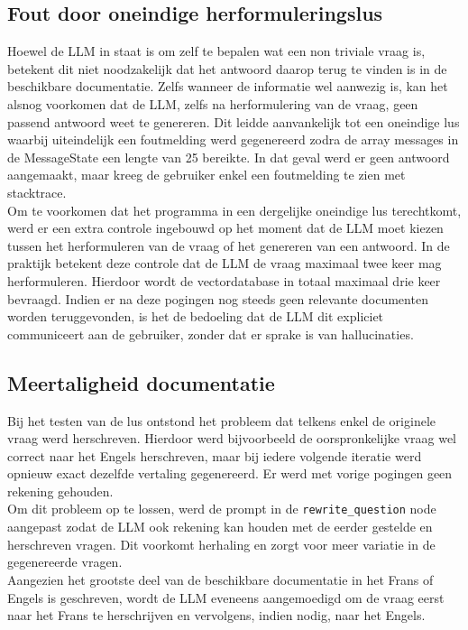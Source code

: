 \subsection{Fout door oneindige herformuleringslus}

Hoewel de LLM in staat is om zelf te bepalen wat een non triviale vraag is, betekent dit niet noodzakelijk dat het antwoord daarop terug te vinden is in de beschikbare documentatie. Zelfs wanneer de informatie wel aanwezig is, kan het alsnog voorkomen dat de LLM, zelfs na herformulering van de vraag, geen passend antwoord weet te genereren. Dit leidde aanvankelijk tot een oneindige lus waarbij uiteindelijk een foutmelding werd gegenereerd zodra de array messages in de MessageState een lengte van 25 bereikte. In dat geval werd er geen antwoord aangemaakt, maar kreeg de gebruiker enkel een foutmelding te zien met stacktrace.
\\[1em]
Om te voorkomen dat het programma in een dergelijke oneindige lus terechtkomt, werd er een extra controle ingebouwd op het moment dat de LLM moet kiezen tussen het herformuleren van de vraag of het genereren van een antwoord. In de praktijk betekent deze controle dat de LLM de vraag maximaal twee keer mag herformuleren. Hierdoor wordt de vectordatabase in totaal maximaal drie keer bevraagd. Indien er na deze pogingen nog steeds geen relevante documenten worden teruggevonden, is het de bedoeling dat de LLM dit expliciet communiceert aan de gebruiker, zonder dat er sprake is van hallucinaties. 

\subsection{Meertaligheid documentatie}
Bij het testen van de lus ontstond het probleem dat telkens enkel de originele vraag werd herschreven. Hierdoor werd bijvoorbeeld de oorspronkelijke vraag wel correct naar het Engels herschreven, maar bij iedere volgende iteratie werd opnieuw exact dezelfde vertaling gegenereerd. Er werd met vorige pogingen geen rekening gehouden.
\\[1em]
Om dit probleem op te lossen, werd de prompt in de \verb|rewrite_question| node aangepast zodat de LLM ook rekening kan houden met de eerder gestelde en herschreven vragen. Dit voorkomt herhaling en zorgt voor meer variatie in de gegenereerde vragen.
\\[1em]
Aangezien het grootste deel van de beschikbare documentatie in het Frans of Engels is geschreven, wordt de LLM eveneens aangemoedigd om de vraag eerst naar het Frans te herschrijven en vervolgens, indien nodig, naar het Engels.

